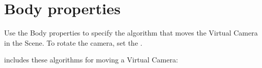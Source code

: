 \chapter{Body properties}
\hypertarget{md__hey_tea_9_2_library_2_package_cache_2com_8unity_8cinemachine_0d2_89_87_2_documentation_0i_2_cinemachine_virtual_camera_body}{}\label{md__hey_tea_9_2_library_2_package_cache_2com_8unity_8cinemachine_0d2_89_87_2_documentation_0i_2_cinemachine_virtual_camera_body}
\label{md__hey_tea_9_2_library_2_package_cache_2com_8unity_8cinemachine_0d2_89_87_2_documentation_0i_2_cinemachine_virtual_camera_body_autotoc_md736}%
%
 Use the Body properties to specify the algorithm that moves the Virtual Camera in the Scene. To rotate the camera, set the .



 includes these algorithms for moving a Virtual Camera\+:


